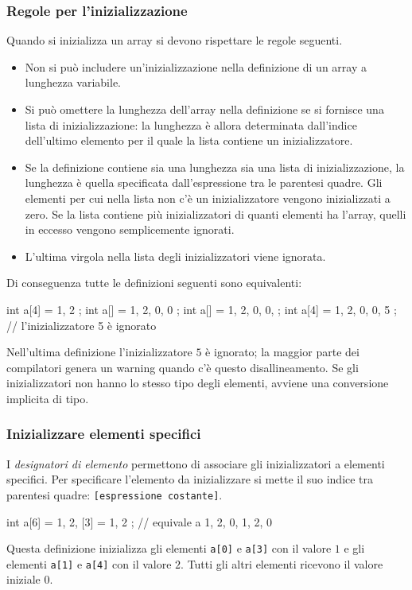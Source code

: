 \documentclass[11pt,a4paper]{article}
\begin{document}
\subsubsection*{Regole per l'inizializzazione}

Quando si inizializza un array si devono rispettare le regole seguenti.
\begin{itemize}
    \item Non si può includere un'inizializzazione nella definizione di un array a lunghezza variabile.
    \item Si può omettere la lunghezza dell'array nella definizione se si fornisce una lista di inizializzazione: la lunghezza è allora determinata dall'indice dell'ultimo elemento per il quale la lista contiene un inizializzatore.
    \item Se la definizione contiene sia una lunghezza sia una lista di inizializzazione, la lunghezza è quella specificata dall'espressione tra le parentesi quadre. Gli elementi per cui nella lista non c'è un inizializzatore vengono inizializzati a zero. Se la lista contiene più inizializzatori di quanti elementi ha l'array, quelli in eccesso vengono semplicemente ignorati.
    \item L'ultima virgola nella lista degli inizializzatori viene ignorata.
\end{itemize}

Di conseguenza tutte le definizioni seguenti sono equivalenti:
\begin{codice}
int a[4] = { 1, 2 };
int a[]  = { 1, 2, 0, 0 };
int a[]  = { 1, 2, 0, 0, };
int a[4] = { 1, 2, 0, 0, 5 };    // l'inizializzatore 5 è ignorato
\end{codice}
Nell'ultima definizione l'inizializzatore $5$ è ignorato; la maggior parte dei compilatori genera un warning quando c'è questo disallineamento. Se gli inizializzatori non hanno lo stesso tipo degli elementi, avviene una conversione implicita di tipo.

\subsubsection*{Inizializzare elementi specifici}

I \emph{designatori di elemento} permettono di associare gli inizializzatori a elementi specifici. Per specificare l'elemento da inizializzare si mette il suo indice tra parentesi quadre: \texttt{[espressione costante]}.
\begin{codice}
int a[6] = { 1, 2, [3] = 1, 2 };   // equivale a { 1, 2, 0, 1, 2, 0 }
\end{codice}
Questa definizione inizializza gli elementi \lstinline|a[0]| e \lstinline|a[3]| con il valore $1$ e gli elementi \lstinline|a[1]| e \lstinline|a[4]| con il valore $2$. Tutti gli altri elementi ricevono il valore iniziale $0$.
\end{document}
